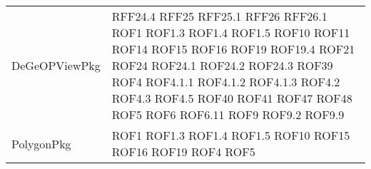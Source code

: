 \begin{longtable}{p{5cm}!{\VRule[1pt]}p{2.5cm}}
		DeGeOPViewPkg & RFF24.4 \newline RFF25 \newline RFF25.1 \newline RFF26 \newline RFF26.1 \newline ROF1 \newline ROF1.3 \newline ROF1.4 \newline ROF1.5 \newline ROF10 \newline ROF11 \newline ROF14 \newline ROF15 \newline ROF16 \newline ROF19 \newline ROF19.4 \newline ROF21 \newline ROF24 \newline ROF24.1 \newline ROF24.2 \newline ROF24.3 \newline ROF39 \newline ROF4 \newline ROF4.1.1 \newline ROF4.1.2 \newline ROF4.1.3 \newline ROF4.2 \newline ROF4.3 \newline ROF4.5 \newline ROF40 \newline ROF41 \newline ROF47 \newline ROF48 \newline ROF5 \newline ROF6 \newline ROF6.11 \newline ROF9 \newline ROF9.2 \newline ROF9.9\\
		PolygonPkg & ROF1 \newline ROF1.3 \newline ROF1.4 \newline ROF1.5 \newline ROF10 \newline ROF15 \newline ROF16 \newline ROF19 \newline ROF4 \newline ROF5\\

\end{longtable}
